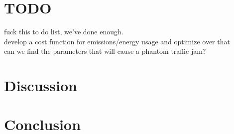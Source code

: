 \documentclass[12pt]{article}
\begin{document}
\section{TODO}
fuck this to do list, we've done enough. \\
develop a cost function for emissions/energy usage and optimize over that \\
can we find the parameters that will cause a phantom traffic jam?


\section{Discussion}

\section{Conclusion}








\end{document}
